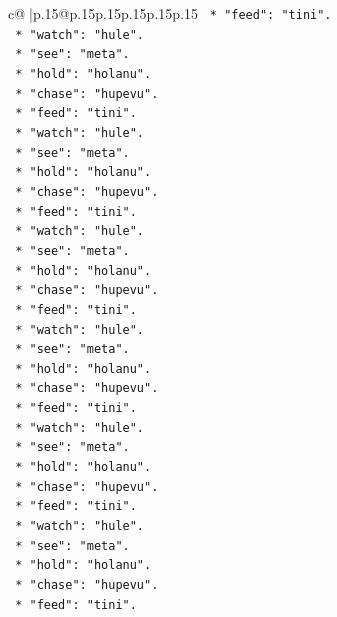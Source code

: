 \documentclass{article}
\begin{document}
{\begin{supertabular}{c@{$\;$}|p{.15\linewidth}@{}p{.15\linewidth}p{.15\linewidth}p{.15\linewidth}p{.15\linewidth}p{.15\linewidth}}
{{{\texttt{            *   "feed": "tini".} \\
\texttt{            *   "watch": "hule".} \\
\texttt{            *   "see": "meta".} \\
\texttt{            *   "hold": "holanu".} \\
\texttt{            *   "chase": "hupevu".} \\
\texttt{            *   "feed": "tini".} \\
\texttt{            *   "watch": "hule".} \\
\texttt{            *   "see": "meta".} \\
\texttt{            *   "hold": "holanu".} \\
\texttt{            *   "chase": "hupevu".} \\
\texttt{            *   "feed": "tini".} \\
\texttt{            *   "watch": "hule".} \\
\texttt{            *   "see": "meta".} \\
\texttt{            *   "hold": "holanu".} \\
\texttt{            *   "chase": "hupevu".} \\
\texttt{            *   "feed": "tini".} \\
\texttt{            *   "watch": "hule".} \\
\texttt{            *   "see": "meta".} \\
\texttt{            *   "hold": "holanu".} \\
\texttt{            *   "chase": "hupevu".} \\
\texttt{            *   "feed": "tini".} \\
\texttt{            *   "watch": "hule".} \\
\texttt{            *   "see": "meta".} \\
\texttt{            *   "hold": "holanu".} \\
\texttt{            *   "chase": "hupevu".} \\
\texttt{            *   "feed": "tini".} \\
\texttt{            *   "watch": "hule".} \\
\texttt{            *   "see": "meta".} \\
\texttt{            *   "hold": "holanu".} \\
\texttt{            *   "chase": "hupevu".} \\
\texttt{            *   "feed": "tini".} \\
}}}
\end{supertabular}}
\end{document}
